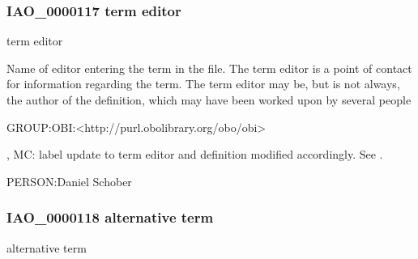 \documentclass[letterpaper,10pt,english]{sphinxmanual}
\begin{document}
\subsubsection{IAO\_0000117 \sphinxhyphen{} term editor}
\label{\detokenize{doc-IAO_0000117:iao-0000117-term-editor}}\label{\detokenize{doc-IAO_0000117:index-0}}\label{\detokenize{doc-IAO_0000117::doc}}
\begin{sphinxShadowBox}

\sphinxAtStartPar
term editor
\end{sphinxShadowBox}

\begin{sphinxShadowBox}

\sphinxAtStartPar
Name of editor entering the term in the file. The term editor is a point of contact for information regarding the term. The term editor may be, but is not always, the author of the definition, which may have been worked upon by several people
\end{sphinxShadowBox}

\begin{sphinxShadowBox}

\sphinxAtStartPar
GROUP:OBI:\textless{}http://purl.obolibrary.org/obo/obi\textgreater{}
\end{sphinxShadowBox}

\begin{sphinxShadowBox}

, MC: label update to term editor and definition modified accordingly. See .
\end{sphinxShadowBox}

\begin{sphinxShadowBox}

\sphinxAtStartPar
PERSON:Daniel Schober
\end{sphinxShadowBox}
\begin{quote}

\ignorespaces \end{quote}


\subsubsection{IAO\_0000118 \sphinxhyphen{} alternative term}
\label{\detokenize{doc-IAO_0000118:iao-0000118-alternative-term}}\label{\detokenize{doc-IAO_0000118:index-0}}\label{\detokenize{doc-IAO_0000118::doc}}
\begin{sphinxShadowBox}

\sphinxAtStartPar
alternative term
\end{sphinxShadowBox}
\end{document}
